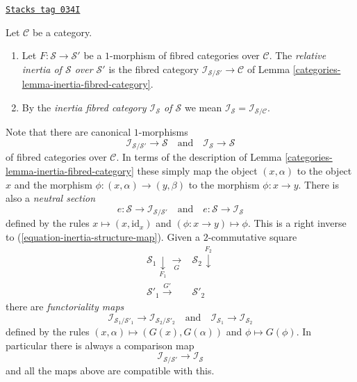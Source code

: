 \begin{definition}
\label{categories-definition-inertia-fibred-category}
\href{https://stacks.math.columbia.edu/tag/034I}{\texttt{Stacks tag 034I}}

Let $\mathcal{C}$ be a category.
\begin{enumerate}
\item Let $F : \mathcal{S} \to \mathcal{S}'$ be a $1$-morphism of
fibred categories over $\mathcal{C}$. The {\it relative inertia
of $\mathcal{S}$ over $\mathcal{S}'$} is the fibred category
$\mathcal{I}_{\mathcal{S}/\mathcal{S}'} \to \mathcal{C}$ of
Lemma \ref{categories-lemma-inertia-fibred-category}.
\item By the {\it inertia fibred category $\mathcal{I}_\mathcal{S}$
of $\mathcal{S}$} we mean
$\mathcal{I}_\mathcal{S} = \mathcal{I}_{\mathcal{S}/\mathcal{C}}$.
\end{enumerate}
\end{definition}

Note that there are canonical $1$-morphisms
\begin{equation}
\label{equation-inertia-structure-map}
\mathcal{I}_{\mathcal{S}/\mathcal{S}'} \longrightarrow \mathcal{S}
\quad\text{and}\quad
\mathcal{I}_\mathcal{S} \longrightarrow \mathcal{S}
\end{equation}
of fibred categories over $\mathcal{C}$. In terms of the description of
Lemma \ref{categories-lemma-inertia-fibred-category}
these simply map the object $(x, \alpha)$ to the object $x$ and the morphism
$\phi : (x, \alpha) \to (y, \beta)$ to the morphism $\phi : x \to y$.
There is also a {\it neutral section}
\begin{equation}
\label{equation-neutral-section}
e : \mathcal{S} \to \mathcal{I}_{\mathcal{S}/\mathcal{S}'}
\quad\text{and}\quad
e : \mathcal{S} \to \mathcal{I}_\mathcal{S}
\end{equation}
defined by the rules $x \mapsto (x, \text{id}_x)$ and
$(\phi : x \to y) \mapsto \phi$. This is a right inverse to
(\ref{equation-inertia-structure-map}). Given a $2$-commutative
square
$$
\begin{array}{cc}\mathcal{S}_1 \underset{F_1}{\downarrow}\underset{G}{\longrightarrow} & \mathcal{S}_2 \overset{F_2}{\downarrow} \\ \mathcal{S}'_1 \overset{G'}{\longrightarrow} & \mathcal{S}'_2\end{array}
$$
there are {\it functoriality maps}
\begin{equation}
\label{equation-functorial}
\mathcal{I}_{\mathcal{S}_1/\mathcal{S}'_1}
\longrightarrow
\mathcal{I}_{\mathcal{S}_2/\mathcal{S}'_2}
\quad\text{and}\quad
\mathcal{I}_{\mathcal{S}_1}
\longrightarrow
\mathcal{I}_{\mathcal{S}_2}
\end{equation}
defined by the rules $(x, \alpha) \mapsto (G(x), G(\alpha))$
and $\phi \mapsto G(\phi)$. In particular there is always a
comparison map
\begin{equation}
\label{equation-comparison}
\mathcal{I}_{\mathcal{S}/\mathcal{S}'}
\longrightarrow
\mathcal{I}_\mathcal{S}
\end{equation}
and all the maps above are compatible with this.

